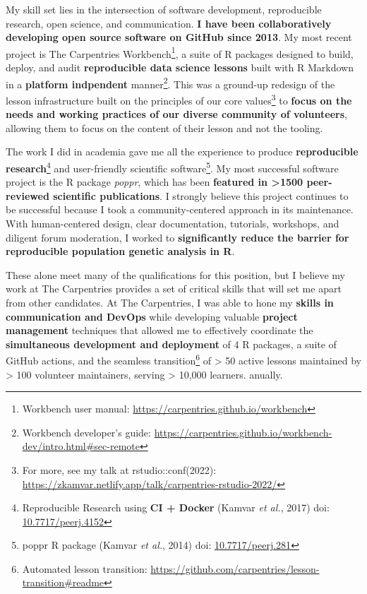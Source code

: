 My skill set lies in the intersection of software development, reproducible
research, open science, and communication. 
\textbf{I have been collaboratively developing open source software on GitHub
since 2013}.
My most recent project is The Carpentries Workbench\footnote{Workbench user manual: \url{https://carpentries.github.io/workbench}}, 
a suite of R packages designed to build, deploy, and audit \textbf{reproducible
data science lessons} built with R Markdown in a \textbf{platform indpendent} manner\footnote{Workbench developer's guide: \url{https://carpentries.github.io/workbench-dev/intro.html\#sec-remote}}.
This was a ground-up redesign of the lesson infrastructure built on the principles
of our core values\footnote{For more, see my talk at rstudio::conf(2022): \url{https://zkamvar.netlify.app/talk/carpentries-rstudio-2022/}}
to \textbf{focus on the needs and working practices of our diverse community of
volunteers}, allowing them to focus on the content of their lesson and not the
tooling.

\vspace{2ex}

The work I did in academia gave me all the experience to produce 
\textbf{reproducible research}\footnote{Reproducible Research using \textbf{CI + Docker} (Kamvar \textit{et al.}, 2017) doi: \href{https://doi.org/10.7717/peerj.4152}{10.7717/peerj.4152}}
and user-friendly scientific software\footnote{poppr R package (Kamvar \textit{et al.}, 2014) doi: \href{https://doi.org/10.7717/peerj.281}{10.7717/peerj.281}}.
My most successful software project is the R package
\textit{poppr}, which has been \textbf{featured in \textgreater1500
peer-reviewed scientific publications}. I strongly believe this project
continues to be successful because I took a community-centered approach in its
maintenance. With human-centered design, clear documentation, tutorials,
workshops, and diligent forum moderation, I worked to \textbf{significantly
reduce the barrier for reproducible population genetic analysis in R}.

\vspace{2ex}

These alone meet many of the qualifications for this position, but I believe my
work at The Carpentries provides a set of critical skills that will set me
apart from other candidates. At The Carpentries, I was able to hone my
\textbf{skills in communication and DevOps} while developing valuable
\textbf{project management} techniques that allowed me to effectively
coordinate the \textbf{simultaneous development and deployment} of 4 R
packages, a suite of GitHub actions, and the seamless transition\footnote{Automated lesson transition: \url{https://github.com/carpentries/lesson-transition\#readme}}
of > 50 active lessons maintained by > 100 volunteer maintainers, serving >
10,000 learners. anually. 

